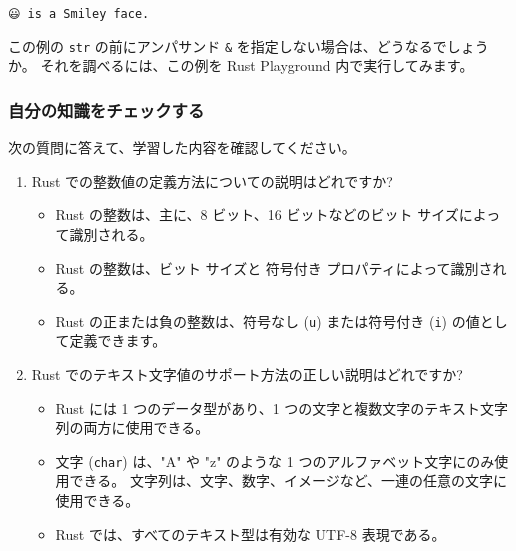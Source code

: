 \begin{lstlisting}[numbers=none]
😃 is a Smiley face.
\end{lstlisting}

この例の \texttt{str} の前にアンパサンド \texttt{&} を指定しない場合は、どうなるでしょうか。 それを調べるには、この例を Rust Playground 内で実行してみます。


\subsubsection{自分の知識をチェックする}

次の質問に答えて、学習した内容を確認してください。

\begin{enumerate}
\item Rust での整数値の定義方法についての説明はどれですか?

\begin{itemize}
\item Rust の整数は、主に、8 ビット、16 ビットなどのビット サイズによって識別される。

\item Rust の整数は、ビット サイズと 符号付き プロパティによって識別される。

\item Rust の正または負の整数は、符号なし (\texttt{u}) または符号付き (\texttt{i}) の値として定義できます。
\end{itemize}

\item Rust でのテキスト文字値のサポート方法の正しい説明はどれですか?

\begin{itemize}
\item Rust には 1 つのデータ型があり、1 つの文字と複数文字のテキスト文字列の両方に使用できる。

\item 文字 (\texttt{char}) は、"A" や "z" のような 1 つのアルファベット文字にのみ使用できる。 文字列は、文字、数字、イメージなど、一連の任意の文字に使用できる。

\item Rust では、すべてのテキスト型は有効な UTF-8 表現である。
\end{itemize}

\end{enumerate}

